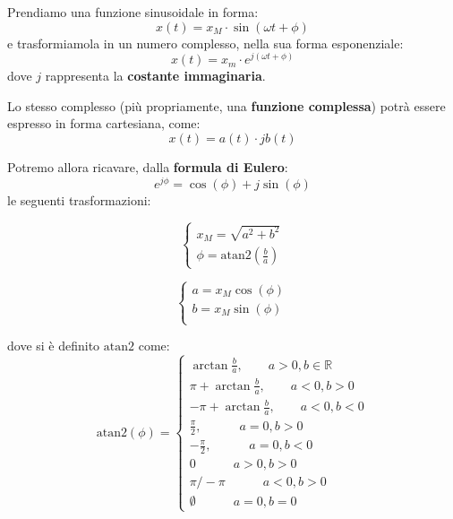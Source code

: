 \documentclass[a4paper,11pt]{article}
\begin{document}
Prendiamo una funzione sinusoidale in forma:
$$
x(t) = x_M \cdot \sin (\omega t + \phi)
$$
e trasformiamola in un numero complesso, nella sua forma esponenziale:
$$
x(t) = x_m \cdot e^{j(\omega t + \phi)}
$$
dove $j$ rappresenta la \textbf{costante immaginaria}.

Lo stesso complesso (più propriamente, una \textbf{funzione complessa}) potrà essere espresso in forma cartesiana, come:
$$
x(t) = a(t) \cdot j b(t)
$$

Potremo allora ricavare, dalla \textbf{formula di Eulero}:
$$
e^{j\phi} = \cos(\phi) + j \sin(\phi)
$$
le seguenti trasformazioni:

\par\medskip

\noindent
\begin{minipage}{0.45\textwidth}
	\begin{center}
		$$
			\begin{cases}
				x_M = \sqrt{a^2 + b^2} \\ 
				\phi = 
					\mathrm{atan2}\left(\frac{b}{a}\right)	
			\end{cases}
	$$
	\end{center}
\end{minipage}
\hfill
\begin{minipage}{0.45\textwidth}
	\begin{center}
		$$	
		\begin{cases}
				a = x_M \cos(\phi) \\ 
				b = x_M \sin(\phi) \\ 
			\end{cases}
			$$
	\end{center}
\end{minipage}

dove si è definito $\mathrm{atan2}$ come:
$$
\mathrm{atan2}(\phi) =
	\begin{cases}
		\arctan{\frac{b}{a}}, \quad \quad a > 0, b \in \mathbb{R} \\ 
					\pi + \arctan{\frac{b}{a}}, \quad \quad a < 0, b > 0 \\ 
					- \pi + \arctan{\frac{b}{a}}, \quad \quad a < 0, b < 0 \\ 
					\frac{\pi}{2}, \quad \quad \quad a = 0, b > 0 \\
					-\frac{\pi}{2}, \quad \quad \quad a = 0, b < 0 \\
					0 \quad \quad \quad a > 0, b > 0 \\ 
					\pi / -\pi \quad \quad \quad a < 0, b > 0 \\
					\emptyset \quad \quad \quad a = 0, b = 0	
	\end{cases}
$$
\end{document}
